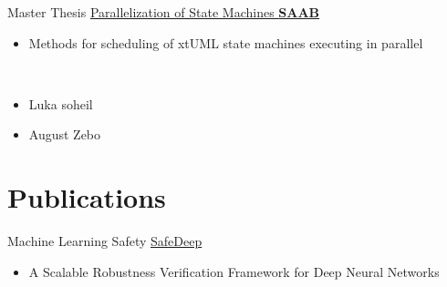 \documentclass[letterpaper]{DS_class_file} %
\begin{document}
\begin{twenty}
 \twentyitem
	{Master}
	{Thesis}
	{\hspace{0.3cm}\href{}{Parallelization of State Machines }}
	{\href{https://www.saab.com/}{\textbf{SAAB}}}
	{}
	{
		{\begin{itemize}
				\item Methods for scheduling of xtUML state machines executing in parallel
		\end{itemize}}
	}
	\\
 \end{twenty}

 
 \begin{itemize}
     \item Luka soheil
     \item August Zebo
 \end{itemize}


\section{Publications}

\begin{twenty} %
    
	\twentyitem
	{Machine Learning}
	{Safety}
	{\hspace{0.3cm}\href{https://ieeexplore.ieee.org/document/10097028}{SafeDeep}}
	{}
	{}
	{
		{\begin{itemize}
				\item A Scalable Robustness Verification Framework for Deep Neural Networks
		\end{itemize}}
	}
	\\
	
	
	
\end{twenty}


\end{document}
